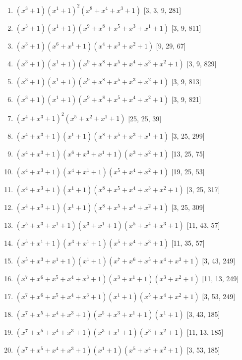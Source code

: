 \documentclass[10pt,twocolumn]{article}
\begin{document}
\begin{enumerate}
\item $(x^{3} + 1)(x^{1} + 1)^{2}(x^{8} + x^{4} + x^{3} + 1)$  [3, 3, 9, 281]
\item $(x^{3} + 1)(x^{1} + 1)(x^{9} + x^{8} + x^{5} + x^{3} + x^{1} + 1)$  [3, 9, 811]
\item $(x^{3} + 1)(x^{6} + x^{1} + 1)(x^{4} + x^{3} + x^{2} + 1)$  [9, 29, 67]
\item $(x^{3} + 1)(x^{1} + 1)(x^{9} + x^{8} + x^{5} + x^{4} + x^{3} + x^{2} + 1)$  [3, 9, 829]
\item $(x^{3} + 1)(x^{1} + 1)(x^{9} + x^{8} + x^{5} + x^{3} + x^{2} + 1)$  [3, 9, 813]
\item $(x^{3} + 1)(x^{1} + 1)(x^{9} + x^{8} + x^{5} + x^{4} + x^{2} + 1)$  [3, 9, 821]
\item $(x^{4} + x^{3} + 1)^{2}(x^{5} + x^{2} + x^{1} + 1)$  [25, 25, 39]
\item $(x^{4} + x^{3} + 1)(x^{1} + 1)(x^{8} + x^{5} + x^{3} + x^{1} + 1)$  [3, 25, 299]
\item $(x^{4} + x^{3} + 1)(x^{6} + x^{3} + x^{1} + 1)(x^{3} + x^{2} + 1)$  [13, 25, 75]
\item $(x^{4} + x^{3} + 1)(x^{4} + x^{1} + 1)(x^{5} + x^{4} + x^{2} + 1)$  [19, 25, 53]
\item $(x^{4} + x^{3} + 1)(x^{1} + 1)(x^{8} + x^{5} + x^{4} + x^{3} + x^{2} + 1)$  [3, 25, 317]
\item $(x^{4} + x^{3} + 1)(x^{1} + 1)(x^{8} + x^{5} + x^{4} + x^{2} + 1)$  [3, 25, 309]
\item $(x^{5} + x^{3} + x^{1} + 1)(x^{3} + x^{1} + 1)(x^{5} + x^{4} + x^{3} + 1)$  [11, 43, 57]
\item $(x^{5} + x^{1} + 1)(x^{3} + x^{1} + 1)(x^{5} + x^{4} + x^{3} + 1)$  [11, 35, 57]
\item $(x^{5} + x^{3} + x^{1} + 1)(x^{1} + 1)(x^{7} + x^{6} + x^{5} + x^{4} + x^{3} + 1)$  [3, 43, 249]
\item $(x^{7} + x^{6} + x^{5} + x^{4} + x^{3} + 1)(x^{3} + x^{1} + 1)(x^{3} + x^{2} + 1)$  [11, 13, 249]
\item $(x^{7} + x^{6} + x^{5} + x^{4} + x^{3} + 1)(x^{1} + 1)(x^{5} + x^{4} + x^{2} + 1)$  [3, 53, 249]
\item $(x^{7} + x^{5} + x^{4} + x^{3} + 1)(x^{5} + x^{3} + x^{1} + 1)(x^{1} + 1)$  [3, 43, 185]
\item $(x^{7} + x^{5} + x^{4} + x^{3} + 1)(x^{3} + x^{1} + 1)(x^{3} + x^{2} + 1)$  [11, 13, 185]
\item $(x^{7} + x^{5} + x^{4} + x^{3} + 1)(x^{1} + 1)(x^{5} + x^{4} + x^{2} + 1)$  [3, 53, 185]

\end{enumerate}
\end{document}
